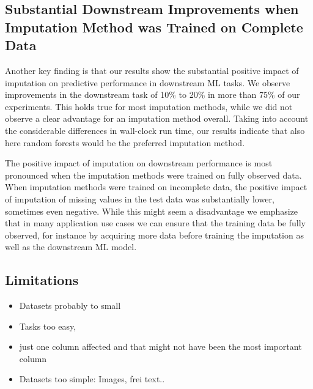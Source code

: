 \subsection{Substantial Downstream Improvements when Imputation Method was Trained on Complete Data}
%
Another key finding is that our results show the substantial positive impact of imputation on predictive performance in downstream ML tasks. We observe improvements in the downstream task of 10\% to 20\% in more than 75\% of our experiments. This holds true for most imputation methods, while we did not observe a clear advantage for an imputation method overall. Taking into account the considerable differences in wall-clock run time, our results indicate that also here random forests would be the preferred imputation method. 

The positive impact of imputation on downstream performance is most pronounced when the imputation methods were trained on fully observed data. When imputation methods were trained on incomplete data, the positive impact of imputation of missing values in the test data was substantially lower, sometimes even negative. While this might seem a disadvantage we emphasize that in many application use cases we can ensure that the training data be fully observed, for instance by acquiring more data before training the imputation as well as the downstream ML model. 

\subsection{Limitations}
%

\begin{itemize}
	\item Datasets probably to small
	\item Tasks too easy,
	\item just one column affected and that might not have been the most important column
	\item Datasets too simple: Images, frei text..
\end{itemize}
